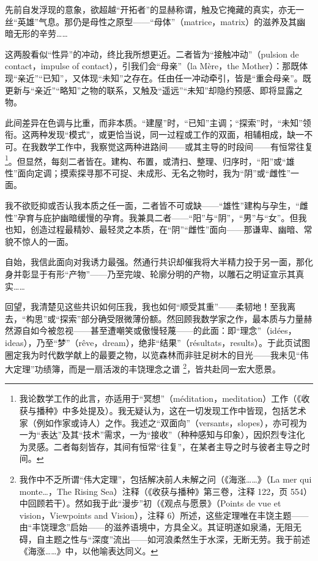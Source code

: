 先前自发浮现的意象，欲超越“开拓者”的显赫称谓，触及它掩藏的真实，亦无一丝“英雄”气息。那仍是母性之原型——“母体”（matrice，matrix）的滋养及其幽暗无形的辛劳……

这两股看似“性异”的冲动，终比我所想更近。二者皆为“接触冲动”（pulsion de contact，impulse of contact），引我们会“母亲”（la Mère，the Mother）：那既体现“亲近”“已知”，又体现“未知”之存在。任由任一冲动牵引，皆是“重会母亲”。既更新与“亲近”“略知”之物的联系，又触及“遥远”“未知”却隐约预感、即将显露之物。

此间差异在色调与比重，而非本质。“建屋”时，“已知”主调；“探索”时，“未知”领衔。这两种发现“模式”，或更恰当说，同一过程或工作的双面，相辅相成，缺一不可。在我数学工作中，我察觉这两种进路间——或其主导的时段间——有恒常往复 \footnote{我论数学工作的此言，亦适用于“冥想”（méditation，meditation）工作（《收获与播种》中多处提及）。我无疑认为，这在一切发现工作中皆现，包括艺术家（例如作家或诗人）之作。我述之“双面向”（versants，slopes），亦可视为一为“表达”及其“技术”需求，一为“接收”（种种感知与印象），因炽烈专注化为灵感。二者每刻皆存，其间有恒常“往复”，在某者主导之时与彼者主导之时间。}。但显然，每刻二者皆在。建构、布置，或清扫、整理、归序时，“阳”或“雄性”面向定调；摸索探寻那不可捉、未成形、无名之物时，我为“阴”或“雌性”一面。

我不欲贬抑或否认我本质之任一面，二者皆不可或缺——“雄性”建构与孕生，“雌性”孕育与庇护幽暗缓慢的孕育。我兼具二者——“阳”与“阴”，“男”与“女”。但我也知，创造过程最精妙、最轻灵之本质，在“阴”“雌性”面向——那谦卑、幽暗、常貌不惊人的一面。

自始，我信此面向对我诱力最强。然通行共识却催我将大半精力投于另一面，那化身并彰显于有形“产物”——乃至完竣、轮廓分明的产物，以雕石之明证宣示其真实……

回望，我清楚见这些共识如何压我，我也如何“顺受其重”——柔韧地！至我离去，“构思”或“探索”部分确受限微薄份额。然回顾我数学家之作，最本质与力量赫然源自如今被忽视——甚至遭嘲笑或傲慢轻蔑——的此面：即“理念”（idées，ideas），乃至“梦”（rêve，dream），绝非“结果”（résultats，results）。于此页试图圈定我为时代数学献上的最要之物，以览森林而非驻足树木的目光——我未见“伟大定理”功绩簿，而是一扇活泼的丰饶理念之谱 \footnote{我作中不乏所谓“伟大定理”，包括解决前人未解之问（《海涨……》（La mer qui monte…，The Rising Sea）注释（《收获与播种》第三卷，注释 122，页 554）中回顾若干）。然如我于此“漫步”初（《观点与愿景》（Points de vue et vision，Viewpoints and Vision），注释 6）所述，这些定理唯在丰饶主题——由“丰饶理念”启始——的滋养语境中，方具全义。其证明遂如泉涌，无阻无碍，自主题之性与“深度”流出——如河浪柔然生于水深，无断无劳。我于前述《海涨……》中，以他喻表达同义。}，皆共赴同一宏大愿景。